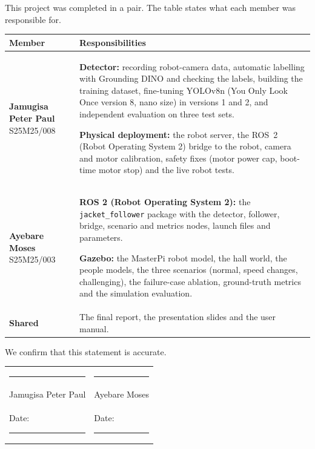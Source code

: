 \documentclass[11pt]{article}
\begin{document}

This project was completed in a pair. The table states what each member was responsible for.

\renewcommand{\arraystretch}{1.3}
\begin{tabularx}{\linewidth}{>{\raggedright\arraybackslash}p{4.2cm} X}
\toprule
\textbf{Member} & \textbf{Responsibilities} \\
\midrule
\textbf{Jamugisa Peter Paul} \newline S25M25/008 &
\textbf{Detector:} recording robot-camera data, automatic labelling with Grounding DINO and checking the labels, building the training dataset, fine-tuning YOLOv8n (You Only Look Once version 8, nano size) in versions 1 and 2, and independent evaluation on three test sets.

\textbf{Physical deployment:} the robot server, the ROS~2 (Robot Operating System 2) bridge to the robot, camera and motor calibration, safety fixes (motor power cap, boot-time motor stop) and the live robot tests. \\
\midrule
\textbf{Ayebare Moses} \newline S25M25/003 &
\textbf{ROS 2 (Robot Operating System 2):} the \texttt{jacket\_follower} package with the detector, follower, bridge, scenario and metrics nodes, launch files and parameters.

\textbf{Gazebo:} the MasterPi robot model, the hall world, the people models, the three scenarios (normal, speed changes, challenging), the failure-case ablation, ground-truth metrics and the simulation evaluation. \\
\midrule
\textbf{Shared} & The final report, the presentation slides and the user manual. \\
\bottomrule
\end{tabularx}

\vspace{1em}
We confirm that this statement is accurate.

\vspace{2.2em}
\begin{tabular}{@{}p{7.2cm}p{7.2cm}@{}}
\rule{6.2cm}{0.4pt} & \rule{6.2cm}{0.4pt} \\
Jamugisa Peter Paul & Ayebare Moses \\
Date: \rule{3cm}{0.4pt} & Date: \rule{3cm}{0.4pt} \\
\end{tabular}
\end{document}
